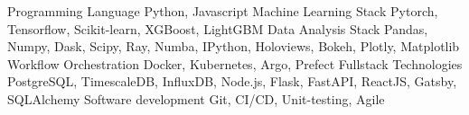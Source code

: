 

\begin{cvskills}

  \cvskill
    {Programming Language}   
    {Python, Javascript}
  \cvskill
    {Machine Learning Stack}   
    {Pytorch, Tensorflow, Scikit-learn, XGBoost, LightGBM}
  \cvskill
    {Data Analysis Stack}   
    {Pandas, Numpy, Dask, Scipy, Ray, Numba, IPython, Holoviews, Bokeh, Plotly, Matplotlib}
  \cvskill
    {Workflow Orchestration}
    {Docker, Kubernetes, Argo, Prefect}
  \cvskill
    {Fullstack Technologies}   
    {PostgreSQL, TimescaleDB, InfluxDB, Node.js, Flask, FastAPI, ReactJS, Gatsby, SQLAlchemy}
  \cvskill
    {Software development}   
    {Git, CI/CD, Unit-testing, Agile}
\end{cvskills}
